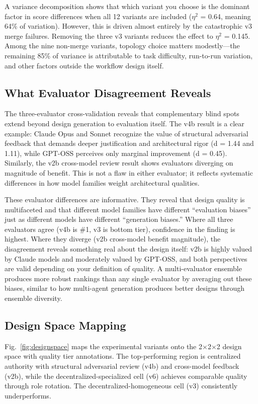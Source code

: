 \documentclass[conference]{IEEEtran}
\begin{document}
A variance decomposition shows that which variant you choose is the dominant factor in score differences when all 12 variants are included ($\eta^2$ = 0.64, meaning 64\% of variation). However, this is driven almost entirely by the catastrophic v3 merge failures. Removing the three v3 variants reduces the effect to $\eta^2$ = 0.145. Among the nine non-merge variants, topology choice matters modestly---the remaining 85\% of variance is attributable to task difficulty, run-to-run variation, and other factors outside the workflow design itself.

\subsection{What Evaluator Disagreement Reveals}

The three-evaluator cross-validation reveals that complementary blind spots extend beyond design generation to evaluation itself. The v4b result is a clear example: Claude Opus and Sonnet recognize the value of structural adversarial feedback that demands deeper justification and architectural rigor (d = 1.44 and 1.11), while GPT-OSS perceives only marginal improvement (d = 0.45). Similarly, the v2b cross-model review result shows evaluators diverging on magnitude of benefit. This is not a flaw in either evaluator; it reflects systematic differences in how model families weight architectural qualities.

These evaluator differences are informative. They reveal that design quality is multifaceted and that different model families have different ``evaluation biases'' just as different models have different ``generation biases.'' Where all three evaluators agree (v4b is \#1, v3 is bottom tier), confidence in the finding is highest. Where they diverge (v2b cross-model benefit magnitude), the disagreement reveals something real about the design itself: v2b is highly valued by Claude models and moderately valued by GPT-OSS, and both perspectives are valid depending on your definition of quality. A multi-evaluator ensemble produces more robust rankings than any single evaluator by averaging out these biases, similar to how multi-agent generation produces better designs through ensemble diversity.

\subsection{Design Space Mapping}

Fig.~\ref{fig:designspace} maps the experimental variants onto the 2$\times$2$\times$2 design space with quality tier annotations. The top-performing region is centralized authority with structural adversarial review (v4b) and cross-model feedback (v2b), while the decentralized-specialized cell (v6) achieves comparable quality through role rotation. The decentralized-homogeneous cell (v3) consistently underperforms.
\end{document}
